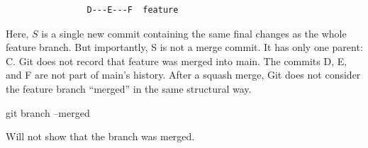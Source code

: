 \documentclass{report}
\begin{document}
\begin{itemize}
\begin{verbatim}
                D---E---F  feature
            \end{verbatim}
            \bigbreak \noindent 
            Here, $S$ is a single new commit containing the same final changes as the whole feature branch.
            \bigbreak \noindent 
            But importantly, S is not a merge commit. It has only one parent: C.
            \bigbreak \noindent 
            Git does not record that feature was merged into main. The commits D, E, and F are not part of main’s history.
            \bigbreak \noindent 
            After a squash merge, Git does not consider the feature branch “merged” in the same structural way.
            \bigbreak \noindent 
            \begin{bashcode}
                git branch --merged
            \end{bashcode}
            \bigbreak \noindent 
            Will not show that the branch was merged.




\end{itemize}
\end{document}

